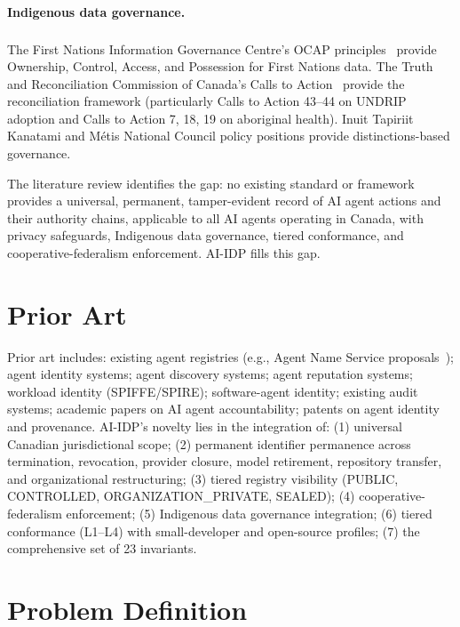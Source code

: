 \documentclass[11pt,a4paper]{article}
\begin{document}
\paragraph{Indigenous data governance.} The First Nations Information Governance Centre's OCAP\textsuperscript{\textregistered} principles~\citep{ocap2014} provide Ownership, Control, Access, and Possession for First Nations data. The Truth and Reconciliation Commission of Canada's Calls to Action~\citep{trc2015} provide the reconciliation framework (particularly Calls to Action 43--44 on UNDRIP adoption and Calls to Action 7, 18, 19 on aboriginal health). Inuit Tapiriit Kanatami and Métis National Council policy positions provide distinctions-based governance.

The literature review identifies the gap: no existing standard or framework provides a universal, permanent, tamper-evident record of AI agent actions and their authority chains, applicable to all AI agents operating in Canada, with privacy safeguards, Indigenous data governance, tiered conformance, and cooperative-federalism enforcement. AI-IDP fills this gap.

\section{Prior Art}
\label{sec:prior-art}

Prior art includes: existing agent registries (e.g., Agent Name Service proposals~\citep{ans2024}); agent identity systems; agent discovery systems; agent reputation systems; workload identity (SPIFFE/SPIRE); software-agent identity; existing audit systems; academic papers on AI agent accountability; patents on agent identity and provenance. AI-IDP's novelty lies in the integration of: (1) universal Canadian jurisdictional scope; (2) permanent identifier permanence across termination, revocation, provider closure, model retirement, repository transfer, and organizational restructuring; (3) tiered registry visibility (PUBLIC, CONTROLLED, ORGANIZATION\_PRIVATE, SEALED); (4) cooperative-federalism enforcement; (5) Indigenous data governance integration; (6) tiered conformance (L1--L4) with small-developer and open-source profiles; (7) the comprehensive set of 23 invariants.

\section{Problem Definition}
\label{sec:problem-definition}
\end{document}
